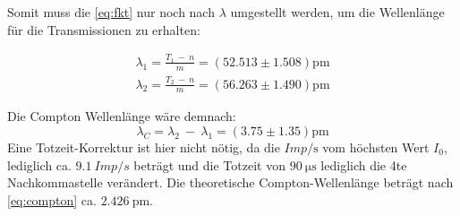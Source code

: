 Somit muss die \autoref{eq:fkt} nur noch nach $\lambda$ umgestellt werden, um die Wellenlänge für die Transmissionen zu erhalten:

\begin{align*}
  \lambda_1 = \frac{T_1\ -\ n}{m} = (52.513 \pm 1.508)\si{\pico\metre}\\
  \lambda_2 = \frac{T_2\ -\ n}{m} = (56.263 \pm 1.490)\si{\pico\metre}
\end{align*}

Die Compton Wellenlänge wäre demnach:
\begin{equation}
  \lambda_C = \lambda_2\ -\ \lambda_1 = (3.75\pm 1.35)\si{\pico\metre}
  \label{eq:eigencomp}
\end{equation}
Eine Totzeit-Korrektur ist hier nicht nötig, da die $Imp\si{\per\second}$ vom höchsten Wert $I_0$, lediglich ca. $9.1\ Imp/s$ beträgt und die Totzeit von $\SI{90}{\micro\second}$ lediglich die 4te Nachkommastelle verändert.
Die theoretische Compton-Wellenlänge beträgt nach \autoref{eq:compton} ca. $\SI{2.426}{\pico\metre}$.